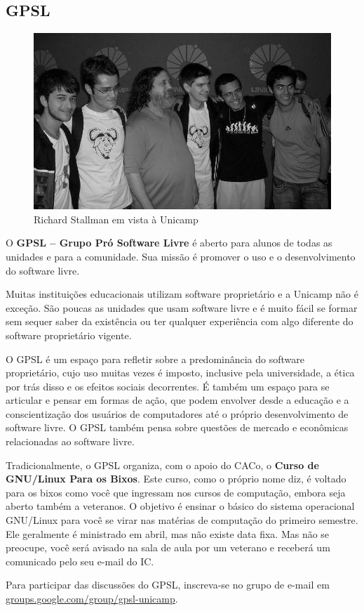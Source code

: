 \subsection{GPSL}

\begin{figure}[h!]
    \centering
    \includegraphics[width=.45\textwidth]{img/alem_da_graduacao/gpsl_foto.jpg}
    \caption{Richard Stallman em vista à Unicamp}
\end{figure}

O \textbf{GPSL -- Grupo Pró Software Livre} é aberto para alunos de todas as
unidades e para a comunidade. Sua missão é promover o uso e o desenvolvimento do
software livre.

Muitas instituições educacionais utilizam software proprietário e a Unicamp não
é exceção. São poucas as unidades que usam software livre e é muito fácil se
formar sem sequer saber da existência ou ter qualquer experiência com algo
diferente do software proprietário vigente.

O GPSL é um espaço para refletir sobre a predominância do software proprietário,
cujo uso muitas vezes é imposto, inclusive pela universidade, a ética por trás
disso e os efeitos sociais decorrentes. É também um espaço para se articular e
pensar em formas de ação, que podem envolver desde a educação e a
conscientização dos usuários de computadores até o próprio desenvolvimento de
software livre. O GPSL também pensa sobre questões de mercado e econômicas
relacionadas ao software livre.

Tradicionalmente, o GPSL organiza, com o apoio do CACo, o \textbf{Curso de
GNU/Linux Para os Bixos}. Este curso, como o próprio nome diz, é voltado para os
bixos como você que ingressam nos cursos de computação, embora seja aberto
também a veteranos. O objetivo é ensinar o básico do sistema operacional
GNU/Linux para você se virar nas matérias de computação do primeiro semestre.
Ele geralmente é ministrado em abril, mas não existe data fixa. Mas não se
preocupe, você será avisado na sala de aula por um veterano e receberá um
comunicado pelo seu e-mail do IC.

Para participar das discussões do GPSL, inscreva-se no grupo de e-mail em
\url{groups.google.com/group/gpsl-unicamp}.

